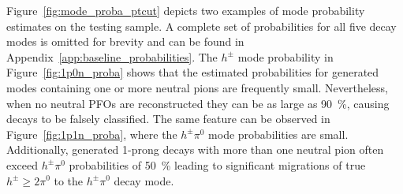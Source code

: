 Figure~\ref{fig:mode_proba_ptcut} depicts two examples of mode probability
estimates on the testing sample. A complete set of probabilities for all five
decay modes is omitted for brevity and can be found in
Appendix~\ref{app:baseline_probabilities}. The $h^\pm$ mode probability in
Figure~\ref{fig:1p0n_proba} shows that the estimated probabilities for generated
modes containing one or more neutral pions are frequently small. Nevertheless,
when no neutral PFOs are reconstructed they can be as large as
\SI{90}{\percent}, causing decays to be falsely classified. The same feature can
be observed in Figure~\ref{fig:1p1n_proba}, where the $h^\pm \pi^0$ mode
probabilities are small. Additionally, generated 1-prong decays with more than
one neutral pion often exceed $h^\pm \pi^0$ probabilities of \SI{50}{\percent}
leading to significant migrations of true $h^\pm \geq 2 \pi^0$ to the
$h^\pm \pi^0$ decay mode.


